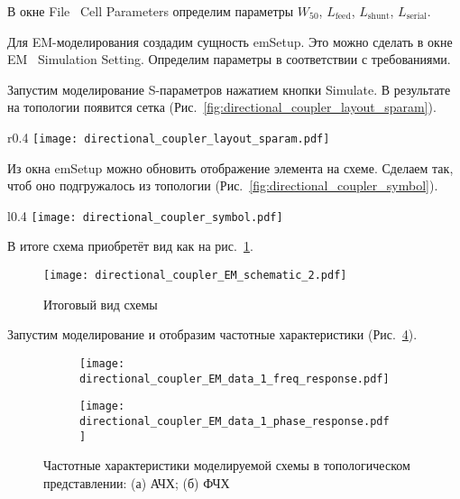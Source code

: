 В окне File \textrightarrow\ Cell Parameters определим параметры $W_{50}$, $L_\text{feed}$, $L_\text{shunt}$, $L_\text{serial}$.

Для EM-моделирования создадим сущность emSetup.
Это можно сделать в окне EM \textrightarrow\ Simulation Setting.
Определим параметры в соответствии с требованиями.

Запустим моделирование S-параметров нажатием кнопки Simulate.
В результате на топологии появится сетка (Рис.~\ref{fig:directional_coupler_layout_sparam}).

\begin{wrapfigure}{r}{0.4\textwidth}
    \centering
    \texttt{[image: directional\_coupler\_layout\_sparam.pdf]}
    \caption{Сетка на топологическом представлении после проведения EM-моделирования}%
    \label{fig:directional_coupler_layout_sparam}
\end{wrapfigure}

Из окна emSetup можно обновить отображение элемента на схеме.
Сделаем так, чтоб оно подгружалось из топологии (Рис.~\ref{fig:directional_coupler_symbol}).

\begin{wrapfigure}{l}{0.4\textwidth}
    \centering
    \texttt{[image: directional\_coupler\_symbol.pdf]}
    \caption{Обновлённый символ}%
    \label{fig:directional_coupler_symbol}
\end{wrapfigure}

В итоге схема приобретёт вид как на рис.~\ref{fig:directional_coupler_EM_schematic_2}.

\begin{figure}[p]
    \centering
    \texttt{[image: directional\_coupler\_EM\_schematic\_2.pdf]}
    \caption{Итоговый вид схемы}%
    \label{fig:directional_coupler_EM_schematic_2}
\end{figure}

Запустим моделирование и отобразим частотные характеристики (Рис.~\ref{fig:directional_coupler_EM_data_1}).

\begin{figure}[!ht]
    \centering
    \begin{subfigure}[b]{0.45\textwidth}
        \centering
        \texttt{[image: directional\_coupler\_EM\_data\_1\_freq\_response.pdf]}
        \caption{}%
    \label{fig:directional_coupler_EM_data_1_freq_response}
    \end{subfigure}
    \hfill
    \begin{subfigure}[b]{0.45\textwidth}
        \centering
        \texttt{[image: directional\_coupler\_EM\_data\_1\_phase\_response.pdf]}
        \caption{}%
    \label{fig:directional_coupler_EM_data_1_phase_response}
    \end{subfigure}
    \caption{%
        Частотные характеристики моделируемой схемы в топологическом представлении:
        (а) АЧХ;
        (б) ФЧХ
    }%
    \label{fig:directional_coupler_EM_data_1}
\end{figure}
